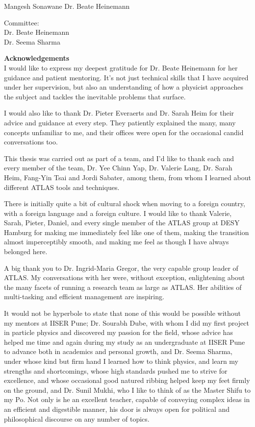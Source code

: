 \documentclass[12pt,a4paper,openright,twoside]{report}
\newcommand\blankpage{%
    \null
    \thispagestyle{empty}%
    \addtocounter{page}{-1}%
    \newpage}
\begin{document}
\begin{center}
Mangesh Sonawane\hspace{8cm}
Dr. Beate Heinemann
\end{center}
\vfill
Committee:\\
Dr. Beate Heinemann\\
Dr. Seema Sharma
\vfill
\vfill
\newpage
\blankpage
\newpage
{\Huge \textbf{Acknowledgements\vspace{2cm}\\}}
I would like to express my deepest gratitude for Dr. Beate Heinemann for her guidance and patient mentoring. It's not just technical skills that I have acquired under her supervision, but also an understanding of how a physicist approaches the subject and tackles the inevitable problems that surface.

I would also like to thank Dr. Pieter Everaerts and Dr. Sarah Heim for their advice and guidance at every step. They patiently explained the many, many concepts unfamiliar to me, and their offices were open for the occasional candid conversations too.

This thesis was carried out as part of a team, and I'd like to thank each and every member of the team, Dr. Yee Chinn Yap, Dr. Valerie Lang, Dr. Sarah Heim, Fang-Yin Tsai and Jordi Sabater, among them, from whom I learned about different ATLAS tools and techniques.

There is initially quite a bit of cultural shock when moving to a foreign country, with a foreign language and a foreign culture. I would like to thank Valerie, Sarah, Pieter, Daniel, and every single member of the ATLAS group at DESY Hamburg for making me immediately feel like one of them, making the transition almost imperceptibly smooth, and making me feel as though I have always belonged here.

A big thank you to Dr. Ingrid-Maria Gregor, the very capable group leader of ATLAS. My conversations with her were, without exception, enlightening about the many facets of running a research team as large as ATLAS. Her abilities of multi-tasking and efficient management are inspiring.

It would not be hyperbole to state that none of this would be possible without my mentors at IISER Pune; Dr. Sourabh Dube, with whom I did my first project in particle physics and discovered my passion for the field, whose advice has helped me time and again during my study as an undergraduate at IISER Pune to advance both in academics and personal growth, and Dr. Seema Sharma, under whose kind but firm hand I learned how to think physics, and learn my strengths and shortcomings, whose high standards pushed me to strive for excellence, and whose occasional good natured ribbing helped keep my feet firmly on the ground, and Dr. Sunil Mukhi, who I like to think of as the Master Shifu to my Po. Not only is he an excellent teacher, capable of conveying complex ideas in an efficient and digestible manner, his door is always open for political and philosophical discourse on any number of topics.
\end{document}
